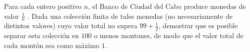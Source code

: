 Para cada entero positivo $n$, el Banco de Ciudad del Cabo produce monedas de valor $\frac 1n$ . Dada una colección finita de tales monedas (no necesariamente de distintos valores) cuyo valor total no supera $99 + \frac 12$, demostrar que es posible separar esta colección en $100$ o menos montones, de
modo que el valor total de cada montón sea como máximo $1$.